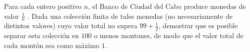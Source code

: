 Para cada entero positivo $n$, el Banco de Ciudad del Cabo produce monedas de valor $\frac 1n$ . Dada una colección finita de tales monedas (no necesariamente de distintos valores) cuyo valor total no supera $99 + \frac 12$, demostrar que es posible separar esta colección en $100$ o menos montones, de
modo que el valor total de cada montón sea como máximo $1$.